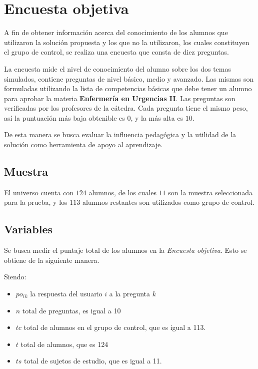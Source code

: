 \section{Encuesta objetiva}
\label{sec:objetiva}

A fin de obtener información acerca del conocimiento de los alumnos que utilizaron 
la solución propuesta y los que no la utilizaron, los cuales constituyen el grupo 
de control, se realiza una encuesta que consta de diez preguntas.

La encuesta mide el nivel de conocimiento del alumno sobre los dos temas
simulados, contiene preguntas de nivel básico, medio y avanzado. Las mismas son
formuladas utilizando la lista de competencias básicas que debe tener un alumno
para aprobar la materia \textbf{Enfermería en Urgencias II}. Las preguntas son
verificadas  por los profesores de la cátedra. Cada pregunta tiene el mismo
peso, así la puntuación más baja obtenible es $0$, y la más alta es $10$.

De esta manera se busca evaluar la influencia pedagógica y la utilidad de la 
solución como herramienta de apoyo al aprendizaje.


\subsection{Muestra}

El universo cuenta con $124$ alumnos, de los cuales $11$ son la muestra seleccionada
para la prueba, y los $113$ alumnos restantes son utilizados
como grupo de control.

\subsection{Variables}

Se busca medir el puntaje total de los alumnos en la \emph{Encuesta objetiva}. Esto 
se obtiene de la siguiente manera.

Siendo:

\begin{itemize}
    \item $po_i{_k}$ la respuesta del usuario $i$ a la pregunta $k$
    \item $n$ total de preguntas, es igual a 10
    \item $tc$ total de alumnos en el grupo de control, que es igual a 113.
    \item $t$ total de alumnos, que es 124
    \item $ts$ total de sujetos de estudio, que es igual a 11.
\end{itemize}

